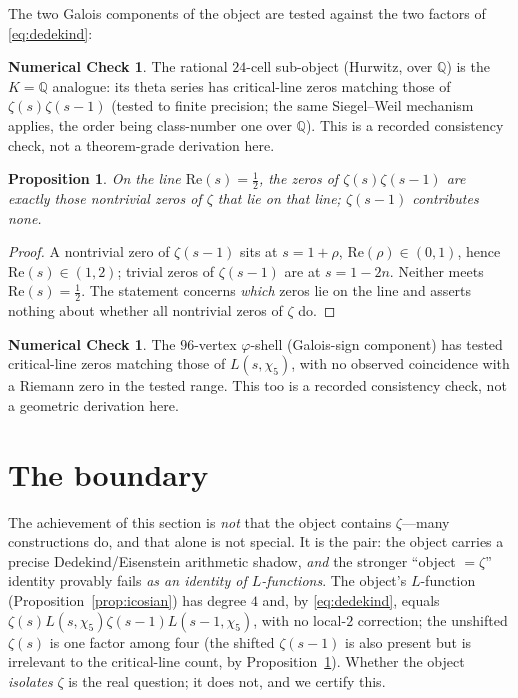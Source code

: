 \documentclass[11pt]{article}
\newtheorem{proposition}[theorem]{Proposition}
\theoremstyle{definition}
\newtheorem{numcheck}[theorem]{Numerical Check}
\newcommand{\Q}{\mathbb{Q}}
\begin{document}
The two Galois components of the object are tested against the two factors of
\eqref{eq:dedekind}:
\begin{numcheck}\label{res:24cell}
The rational $24$-cell sub-object (Hurwitz, over $\Q$) is the $K=\Q$ analogue: its theta
series has critical-line zeros matching those of $\zeta(s)\zeta(s-1)$ (tested to finite
precision; the same Siegel--Weil mechanism applies, the order being class-number one
over $\Q$). This is a recorded consistency check, not a theorem-grade derivation here.
\end{numcheck}
\begin{proposition}\label{prop:online}
On the line $\mathrm{Re}(s)=\tfrac12$, the zeros of $\zeta(s)\zeta(s-1)$ are exactly
those nontrivial zeros of $\zeta$ that lie on that line; $\zeta(s-1)$ contributes none.
\end{proposition}
\begin{proof}
A nontrivial zero of $\zeta(s-1)$ sits at $s=1+\rho$, $\mathrm{Re}(\rho)\in(0,1)$, hence
$\mathrm{Re}(s)\in(1,2)$; trivial zeros of $\zeta(s-1)$ are at $s=1-2n$. Neither meets
$\mathrm{Re}(s)=\tfrac12$. The statement concerns \emph{which} zeros lie on the line and
asserts nothing about whether all nontrivial zeros of $\zeta$ do.
\end{proof}
\begin{numcheck}\label{res:twin}
The $96$-vertex $\varphi$-shell (Galois-sign component) has tested critical-line zeros matching
those of $L(s,\chi_5)$, with no observed coincidence with a Riemann zero in the tested
range. This too is a recorded consistency check, not a geometric derivation here.
\end{numcheck}

\section{The boundary}\label{sec:boundary}
The achievement of this section is \emph{not} that the object contains $\zeta$---many
constructions do, and that alone is not special. It is the pair: the object carries a
precise Dedekind/Eisenstein arithmetic shadow, \emph{and} the stronger
``object $=\zeta$'' identity provably fails \emph{as an identity of $L$-functions}. The
object's $L$-function
(Proposition~\ref{prop:icosian}) has degree $4$ and, by \eqref{eq:dedekind}, equals
$\zeta(s)L(s,\chi_5)\zeta(s-1)L(s-1,\chi_5)$, with no local-$2$ correction; the unshifted
$\zeta(s)$ is one factor among four (the shifted $\zeta(s-1)$ is also present but is
irrelevant to the critical-line count, by Proposition~\ref{prop:online}). Whether the
object \emph{isolates} $\zeta$ is the real question; it does not, and we certify this.
\end{document}
